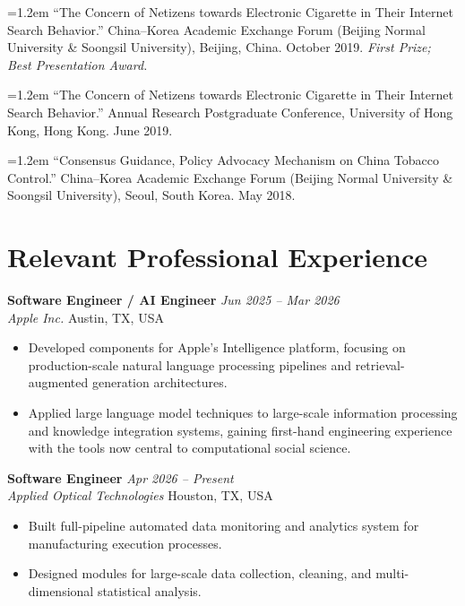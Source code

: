 \documentclass[11pt, letterpaper]{article}
\newcommand{\pubentry}[1]{%
  \noindent\hangindent=1.2em\hangafter=1 #1\par\vspace{4pt}
}
\begin{document}
\pubentry{``The Concern of Netizens towards Electronic Cigarette in Their
Internet Search Behavior.''
China--Korea Academic Exchange Forum (Beijing Normal University \& Soongsil University),
Beijing, China. October 2019.
\textit{First Prize; Best Presentation Award.}}

\pubentry{``The Concern of Netizens towards Electronic Cigarette in
Their Internet Search Behavior.''
Annual Research Postgraduate Conference, University of Hong Kong,
Hong Kong. June 2019.}

\pubentry{``Consensus Guidance, Policy Advocacy Mechanism on China Tobacco Control.''
China--Korea Academic Exchange Forum (Beijing Normal University \& Soongsil University),
Seoul, South Korea. May 2018.}

\section{Relevant Professional Experience}

\noindent\textbf{Software Engineer / AI Engineer}
\hfill \textit{Jun 2025 -- Mar 2026}\\
\textit{Apple Inc.} \hfill Austin, TX, USA
\begin{itemize}
  \item Developed components for Apple's Intelligence platform, focusing on
        production-scale natural language processing pipelines and
        retrieval-augmented generation architectures.
  \item Applied large language model techniques to large-scale information
        processing and knowledge integration systems, gaining first-hand
        engineering experience with the tools now central to computational
        social science.
\end{itemize}

\vspace{6pt}
\noindent\textbf{Software Engineer}
\hfill \textit{Apr 2026 -- Present}\\
\textit{Applied Optical Technologies} \hfill Houston, TX, USA
\begin{itemize}
  \item Built full-pipeline automated data monitoring and analytics system
        for manufacturing execution processes.
  \item Designed modules for large-scale data collection, cleaning, and
        multi-dimensional statistical analysis.
\end{itemize}
\end{document}
